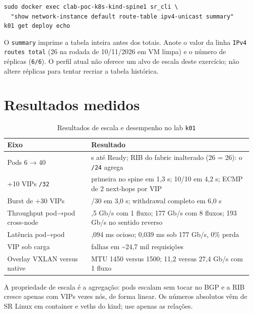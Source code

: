 \documentclass[12pt,openany,oneside,a4paper,chapter=TITLE,english,brazil]{abntex2}
\begin{document}
\begin{verbatim}
sudo docker exec clab-poc-k8s-kind-spine1 sr_cli \
  "show network-instance default route-table ipv4-unicast summary"
k01 get deploy echo
\end{verbatim}

O \texttt{summary} imprime a tabela inteira antes dos totais. Anote o valor da linha
\texttt{IPv4 routes total} (26 na rodada de 10/11/2026 em VM limpa) e o número de
réplicas (\texttt{6/\allowbreak{}6}). O perfil atual não
oferece um alvo de escala deste exercício; não altere réplicas para tentar
recriar a tabela histórica.

\section{Resultados medidos}\label{resultados-medidos-1}

\begin{table}[!htbp]
\caption{Resultados de escala e desempenho no lab \texttt{k01}}
\footnotesize
\begin{tabularx}{\textwidth}{>{\raggedright\arraybackslash\hsize=0.773\hsize}X>{\raggedright\arraybackslash\hsize=1.227\hsize}X}
\toprule
\textbf{Eixo} & \textbf{Resultado} \\
\midrule
Pods 6 → 40 & 13 s até Ready; RIB do fabric inalterado (26 = 26): o
\texttt{/\allowbreak{}24} agrega \\
+10 VIPs \texttt{/\allowbreak{}32} & primeira no spine em 1,3 s; 10/10 em 4,2 s; ECMP de 2 next-hops por VIP \\
Burst de +30 VIPs & 30/30 em 3,0 s; withdrawal completo em 6,0 s \\
Throughput pod→pod cross-node & 27,5 Gb/s com 1 fluxo; 177 Gb/s com 8 fluxos; 193 Gb/s no sentido
reverso \\
Latência pod→pod & 0,094 ms ocioso; 0,039 ms sob 177 Gb/s, 0\% perda \\
VIP sob carga & 0 falhas em \textasciitilde24,7 mil requisições \\
Overlay VXLAN versus native & MTU 1450 versus 1500; 11,2 versus 27,4 Gb/s com 1 fluxo \\
\bottomrule
\end{tabularx}
\end{table}

A propriedade de escala é a agregação: pods escalam sem tocar no BGP e a RIB
cresce apenas com VIPs vezes nós, de forma linear. Os números absolutos vêm de
SR Linux em container e veths do kind; use apenas as relações.
\end{document}
